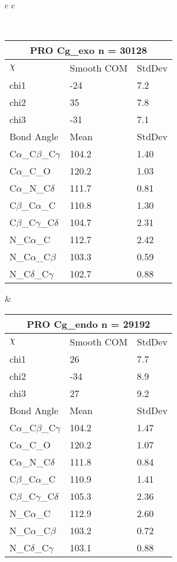 \begin{longtable}{ c c }

\caption{PRO Central Values}\\
  \begin{tabular}{ l l l }
  \toprule
  \multicolumn{3}{c}{PRO \textbf{Cg\_exo} n = 30128} \\ \toprule
  $\chi$       & Smooth COM & StdDev \\ \midrule
  chi1 & -24 & 7.2 \\ 
  chi2 & 35 & 7.8 \\ 
  chi3 & -31 & 7.1 \\ \midrule
  Bond Angle   & Mean     & StdDev \\ \midrule
  C$\alpha$\_C$\beta$\_C$\gamma$ & 104.2 & 1.40\\
  C$\alpha$\_C\_O & 120.2 & 1.03\\
  C$\alpha$\_N\_C$\delta$ & 111.7 & 0.81\\
  C$\beta$\_C$\alpha$\_C & 110.8 & 1.30\\
  C$\beta$\_C$\gamma$\_C$\delta$ & 104.7 & 2.31\\
  N\_C$\alpha$\_C & 112.7 & 2.42\\
  N\_C$\alpha$\_C$\beta$ & 103.3 & 0.59\\
  N\_C$\delta$\_C$\gamma$ & 102.7 & 0.88\\
  \bottomrule
  \end{tabular}
  &
  \begin{tabular}{ l l l }
  \toprule
  \multicolumn{3}{c}{PRO \textbf{Cg\_endo} n = 29192} \\ \toprule
  $\chi$       & Smooth COM & StdDev \\ \midrule
  chi1 & 26 & 7.7 \\ 
  chi2 & -34 & 8.9 \\ 
  chi3 & 27 & 9.2 \\ \midrule
  Bond Angle   & Mean     & StdDev \\ \midrule
  C$\alpha$\_C$\beta$\_C$\gamma$ & 104.2 & 1.47\\
  C$\alpha$\_C\_O & 120.2 & 1.07\\
  C$\alpha$\_N\_C$\delta$ & 111.8 & 0.84\\
  C$\beta$\_C$\alpha$\_C & 110.9 & 1.41\\
  C$\beta$\_C$\gamma$\_C$\delta$ & 105.3 & 2.36\\
  N\_C$\alpha$\_C & 112.9 & 2.60\\
  N\_C$\alpha$\_C$\beta$ & 103.2 & 0.72\\
  N\_C$\delta$\_C$\gamma$ & 103.1 & 0.88\\
  \bottomrule
  \end{tabular}
  \\
  
\end{longtable}

